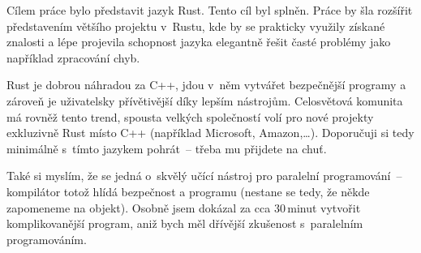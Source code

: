 \documentclass[main.tex]{subfiles}
\begin{document}

Cílem práce bylo představit jazyk Rust. Tento cíl byl splněn. Práce by šla rozšířit
představením většího projektu v~Rustu, kde by se prakticky využily získané znalosti a lépe
projevila schopnost jazyka elegantně řešit časté problémy jako například zpracování chyb.

Rust je dobrou náhradou za C++, jdou v~něm vytvářet bezpečnější programy a zároveň je
uživatelsky přívětivější díky lepším nástrojům. Celosvětová komunita má rovněž tento
trend, spousta velkých společností volí pro nové projekty exkluzivně Rust místo C++
(například Microsoft, Amazon,\dots). Doporučuji si tedy minimálně s~tímto jazykem
pohrát~-- třeba mu přijdete na chuť.

Také si myslím, že se jedná o~skvělý učící nástroj pro paralelní programování~--
kompilátor totož hlídá bezpečnost a  programu (nestane se tedy, že někde
zapomeneme na  objekt). Osobně jsem dokázal za cca 30\,minut vytvořit
komplikovanější program, aniž bych měl dřívější zkušenost s~paralelním programováním.
\end{document}
